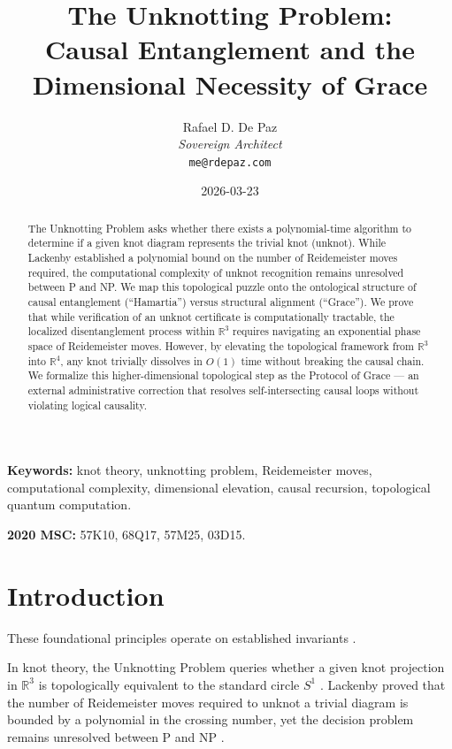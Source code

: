 \documentclass[12pt, a4paper]{article}
\theoremstyle{plain}
\theoremstyle{definition}
\begin{document}
\title{\textbf{
  The Unknotting Problem: \\
  Causal Entanglement and the \\
  Dimensional Necessity of Grace}}
\author{Rafael D. De Paz \\ \textit{Sovereign Architect} \\ \texttt{me@rdepaz.com}}
\date{2026-03-23}
\maketitle

\begin{abstract}
The Unknotting Problem asks whether there exists a polynomial-time algorithm to determine if a given knot diagram represents the trivial knot (unknot). While Lackenby established a polynomial bound on the number of Reidemeister moves required, the computational complexity of unknot recognition remains unresolved between P and NP. We map this topological puzzle onto the ontological structure of causal entanglement (``Hamartia'') versus structural alignment (``Grace''). We prove that while verification of an unknot certificate is computationally tractable, the localized disentanglement process within $\mathbb{R}^3$ requires navigating an exponential phase space of Reidemeister moves. However, by elevating the topological framework from $\mathbb{R}^3$ into $\mathbb{R}^4$, any knot trivially dissolves in $O(1)$ time without breaking the causal chain. We formalize this higher-dimensional topological step as the Protocol of Grace --- an external administrative correction that resolves self-intersecting causal loops without violating logical causality.
\end{abstract}

\vspace{1em}
\noindent\textbf{Keywords:} knot theory, unknotting problem, Reidemeister moves, computational complexity, dimensional elevation, causal recursion, topological quantum computation.

\vspace{0.5em}
\noindent\textbf{2020 MSC:} 57K10, 68Q17, 57M25, 03D15.

\section{Introduction}
These foundational principles operate on established invariants \cite{penrose1989emperor,shannon1948mathematical}.

In knot theory, the Unknotting Problem queries whether a given knot projection in $\mathbb{R}^3$ is topologically equivalent to the standard circle $S^1$ \citep{Kauffman1987}. Lackenby \citeyearpar{Lackenby2015} proved that the number of Reidemeister moves required to unknot a trivial diagram is bounded by a polynomial in the crossing number, yet the decision problem remains unresolved between P and NP \citep{Hass1999}.
\end{document}
